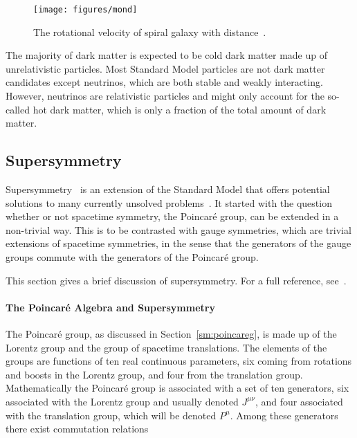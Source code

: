 \begin{figure}[H]
	\texttt{[image: figures/mond]}
	\centering
	\caption{The rotational velocity of spiral galaxy with distance~\cite{darkmfig01}.}
	\label{f:darkmatterrot}
\end{figure}

The majority of dark matter is expected to be cold dark matter made up of
unrelativistic particles. Most Standard Model particles are not dark matter
candidates except neutrinos, which are both stable and weakly interacting.
However, neutrinos are relativistic particles and might only account for the
so-called hot dark matter, which is only a fraction of the total amount of dark
matter.

\subsection{Supersymmetry}


Supersymmetry~\cite{Golfand:1971iw,Volkov:1973ix,Wess:1974tw,Wess:1974jb,Ferrara:1974pu,Salam:1974ig}
is an extension of the Standard Model that offers potential solutions to many
currently unsolved problems~\cite{susysol01, susysol02, susysol03, susysol04,
	susysol05}. It started with the question whether or not spacetime symmetry, the
Poincar\'{e} group, can be extended in a non-trivial way. This is to be
contrasted with gauge symmetries, which are trivial extensions of spacetime
symmetries, in the sense that the generators of the gauge groups commute with
the generators of the Poincar\'{e} group.

This section gives a brief discussion of supersymmetry. For a full reference,
see~\cite{susytext01}.

\paragraph{The Poincar\'{e} Algebra and Supersymmetry} The Poincar\'{e} group,
as discussed in Section~\ref{sm:poincareg}, is made up of the Lorentz group and
the group of spacetime translations. The elements of the groups are functions
of ten real continuous parameters, six coming from rotations and boosts in the
Lorentz group, and four from the translation group. Mathematically the
Poincar\'{e} group is associated with a set of ten generators, six associated
with the Lorentz group and usually denoted $J^{\mu\nu}$, and four associated
with the translation group, which will be denoted $P^{\mu}$. Among these
generators there exist commutation relations

